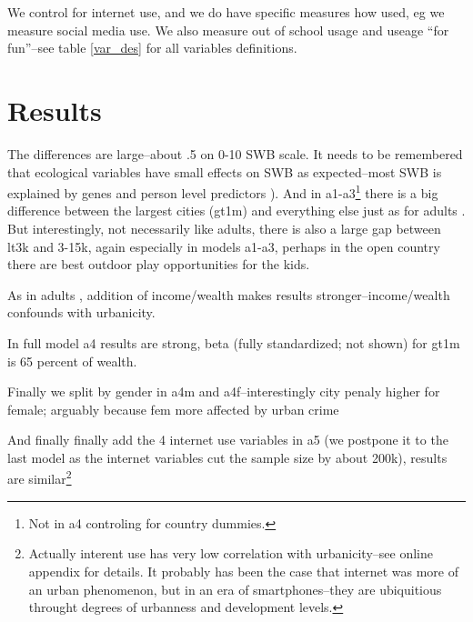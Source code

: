 \documentclass[10pt, letterpaper]{article}
\begin{document}
\begin{spacing}{1.4}
We control for internet use, and we do  have specific measures how used, eg we
 measure social media use.  We also measure out of school usage and useage ``for
 fun''--see table \ref{var_des} for all variables definitions. 

 

\section{Results}



The differences are large--about .5 on 0-10 SWB scale. It needs to be remembered
that ecological variables have small effects on SWB as
 expected--most SWB is explained by genes \citep{schnittker08} and person level
 predictors \citep{veenhoven14b}). %
 And in a1-a3\footnote{Not
in a4 controling for country dummies.} there is a big
difference between the largest cities (gt1m) and everything else just as for
adults \citep{aok-ls_fisher16}. But interestingly, not necessarily like adults,
there is also a large gap between lt3k and 3-15k, again especially in models
a1-a3, perhaps in the open country there are best outdoor play opportunities for
the kids.

As in adults \citep{aok21}, addition of income/wealth makes results
stronger--income/wealth confounds with urbanicity.

In full model a4 results are strong, beta (fully standardized; not shown) for
gt1m is 65 percent of wealth.

Finally we split by gender in a4m and a4f--interestingly city penaly higher for
female; arguably because fem more affected by urban crime

And finally finally add the 4 internet use variables in a5 (we postpone it to
the last model as the internet variables cut the sample size by about 200k),
results are similar\footnote{Actually interent use has very low correlation
  with urbanicity--see online appendix for details. It probably has been the case
  that internet was more of an urban phenomenon, but in an era of
  smartphones--they are ubiquitious throught degrees of urbanness and
  development levels.}


\end{spacing}
\end{document}
